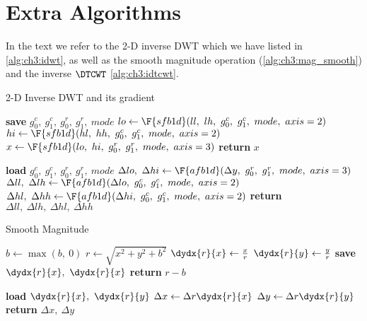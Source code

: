 \section{Extra Algorithms}
In the text we refer to the 2-D inverse DWT which we have listed in
\autoref{alg:ch3:idwt}, as well as the smooth magnitude operation
(\autoref{alg:ch3:mag_smooth}) and the inverse $\DTCWT$ \autoref{alg:ch3:idtcwt}.

\begin{algorithm}[h!]
\caption{2-D Inverse DWT and its gradient}\label{alg:ch3:idwt}
\begin{algorithmic}[1]
  \State \textbf{save} $g_0^c,\ g_1^c,\ g_0^r,\ g_1^r,\ mode$  \label{line:ch3:idwt_save}
  \State $lo \gets \F{sfb1d}(ll,\ lh,\ g_0^c,\ g_1^c,\ mode,\ axis=2) $ 
  \State $hi \gets \F{sfb1d}(hl,\ hh,\ g_0^c,\ g_1^c,\ mode,\ axis=2) $
  \State $x \gets \F{sfb1d}(lo,\ hi,\ g_0^r,\ g_1^r,\ mode,\ axis=3) $
  \State \textbf{return} $x$
\EndFunction
\end{algorithmic}\vspace{10pt}
\begin{algorithmic}[1]
  \State \textbf{load} $g_0^c,\ g_1^c,\ g_0^r,\ g_1^r,\ mode$
  \State $\Delta lo,\ \Delta hi \gets \F{afb1d}(\Delta y,\ g_0^r,\ g_1^r,\ mode,\ axis=3)$ 
  \State $\Delta ll,\ \Delta lh \gets \F{afb1d}(\Delta lo,\ g_0^c,\ g_1^c,\ mode,\ axis=2)$ 
  \State $\Delta hl,\ \Delta hh \gets \F{afb1d}(\Delta hi,\ g_0^c,\ g_1^c,\ mode,\ axis=2)$ 
  \State \textbf{return} $\Delta ll,\ \Delta lh,\ \Delta hl,\ \Delta hh$
\EndFunction
\end{algorithmic}
\end{algorithm}

\begin{algorithm}[tb]
\caption{Smooth Magnitude}\label{alg:ch3:mag_smooth}
\begin{algorithmic}[1]
  \State $b \gets \max(b,\ 0)$
  \State $r \gets \sqrt{x^2 + y^2 + b^2}$
  \State $\dydx{r}{x} \gets \frac{x}{r}$
  \State $\dydx{r}{y} \gets \frac{y}{r}$
  \State \textbf{save} $\dydx{r}{x},\ \dydx{r}{x}$
  \State \textbf{return} $r - b$
\EndFunction
\end{algorithmic}\vspace{10pt}
\begin{algorithmic}[1]
  \State \textbf{load} $\dydx{r}{x},\ \dydx{r}{y}$
  \State $\Delta x \gets \Delta r \dydx{r}{x}$
  \State $\Delta y \gets \Delta r \dydx{r}{y}$
  \State \textbf{return} $\Delta x,\ \Delta y$
\EndFunction
\end{algorithmic}
\end{algorithm}

